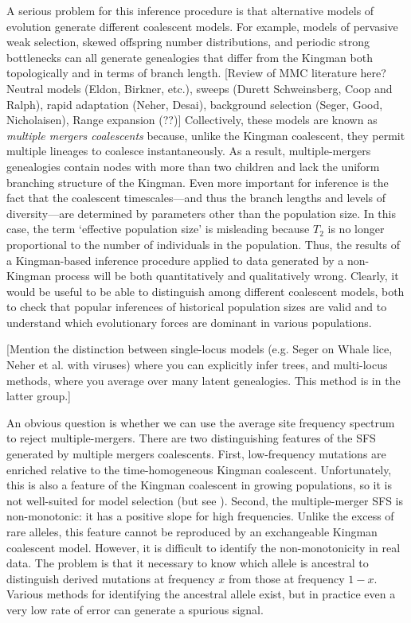 \documentclass[11pt, letterpaper]{article}   	%
\begin{document}
A serious problem for this inference procedure is that alternative models of evolution generate different coalescent models.
For example, models of pervasive weak selection, skewed offspring number distributions, and periodic strong bottlenecks can all generate genealogies that differ from the Kingman both topologically and in terms of branch length.
[Review of MMC literature here? Neutral models (Eldon, Birkner, etc.), sweeps (Durett Schweinsberg, Coop and Ralph), rapid adaptation (Neher, Desai), background selection (Seger, Good, Nicholaisen), Range expansion (??)]
Collectively, these models are known as \emph{multiple mergers coalescents} because, unlike the Kingman coalescent, they permit multiple lineages to coalesce instantaneously.
As a result, multiple-mergers genealogies contain nodes with more than two children and lack the uniform branching structure of the Kingman.
Even more important for inference is the fact that the coalescent timescales---and thus the branch lengths and levels of diversity---are determined by parameters other than the population size.
In this case, the term `effective population size' is misleading because $T_2$ is no longer proportional to the number of individuals in the population.
Thus, the results of a Kingman-based inference procedure applied to data generated by a non-Kingman process will be both quantitatively and qualitatively wrong.
Clearly, it would be useful to be able to distinguish among different coalescent models, both to check that popular inferences of historical population sizes are valid and to understand which evolutionary forces are dominant in various populations.

[Mention the distinction between single-locus models (e.g. Seger on Whale lice, Neher et al. with viruses) where you can explicitly infer trees, and multi-locus methods, where you average over many latent genealogies. This method is in the latter group.]

An obvious question is whether we can use the average site frequency spectrum to reject multiple-mergers.
There are two distinguishing features of the SFS generated by multiple mergers coalescents.
First, low-frequency mutations are enriched relative to the time-homogeneous Kingman coalescent.
Unfortunately, this is also a feature of the Kingman coalescent in growing populations, so it is not well-suited for model selection (but see \cite{}).
Second, the multiple-merger SFS is non-monotonic: it has a positive slope for high frequencies.
Unlike the excess of rare alleles, this feature cannot be reproduced by an exchangeable Kingman coalescent model.
However, it is difficult to identify the non-monotonicity in real data.
The problem is that it necessary to know which allele is ancestral to distinguish derived mutations at frequency $x$ from those at frequency $1-x$.
Various methods for identifying the ancestral allele exist, but in practice even a very low rate of error can generate a spurious signal.
\end{document}
